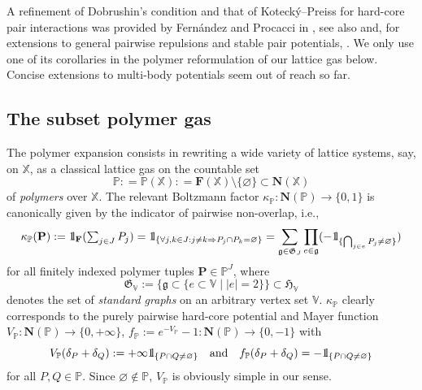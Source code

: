 \documentclass[10pt,a4paper]{amsart}
\renewcommand{\P}{\mathbb{P}}
\newcommand{\X}{\mathbb X}
\newcommand{\V}{\mathbb V}
\def\1{{\mathchoice {1\mskip-4mu\mathrm l}      
{1\mskip-4mu\mathrm l}
{1\mskip-4.5mu\mathrm l} {1\mskip-5mu\mathrm l}}}
\begin{document}
A refinement of Dobrushin's condition and that of Koteck{\'y}--Preiss for hard-core pair interactions was provided by Fern{\'a}ndez and Procacci in \cite{ref:fernandez-procacci}, see also \cite{ref:bissacot-fernandez-procacci} and, for extensions to general pairwise repulsions and stable pair potentials, \cite{ref:faris, ref:jansen-cluster, ref:jansen-kolesnikov}. 
We only use one of its corollaries in the polymer reformulation of our lattice gas below. 
Concise extensions to multi-body potentials seem out of reach so far.

\subsection{The subset polymer gas}

The polymer expansion consists in rewriting a wide variety of lattice systems, say, on $\X$, as a classical lattice gas on the countable set
\[
	\P : = \P(\X) : = \mathbf F(\X) \setminus \{\varnothing\} \subset \mathbf N(\X)
\]
of \emph{polymers} over $\X$. 
The relevant Boltzmann factor $\kappa_\P : \mathbf N(\P) \to \{0, 1\}$ is canonically given by the indicator of pairwise non-overlap, i.e.,
\[
	\kappa_\P (\mathbf P) : = \1_\mathbf F({\textstyle \sum_{j \in J} P_j}) = \1_{\{\forall j, k \in J : j \neq k \Rightarrow P_j \cap P_k = \varnothing\}} = \sum_{\mathfrak g \in \mathfrak G_J} \prod_{e \in \mathfrak g} (-\1_{\{\bigcap_{j\in e} P_j \neq \varnothing\}})
\]
for all finitely indexed polymer tuples $\mathbf P \in \P^J$, where
\[
	\mathfrak G_\V := \{\mathfrak g \subset \{e \subset \V \mid |e| = 2\}\} \subset \mathfrak H_\V
\]
denotes the set of \emph{standard graphs} on an arbitrary vertex set $\V$. 
$\kappa_\P$ clearly corresponds to the purely pairwise hard-core potential and Mayer function $V_\P : \mathbf N(\P) \to \{0,+\infty\}$, $f_\P := e^{-V_\P}-1 : \mathbf N(\P) \to \{0, -1\}$ with
\[
	V_\P(\delta_P + \delta_Q) := +\infty \1_{\{P \cap Q \neq \varnothing\}} \quad \text{and} \quad f_\P(\delta_P + \delta_Q) = -\1_{\{P \cap Q \neq \varnothing\}}
\]
for all $P, Q \in \P$. 
Since $\varnothing \notin \P$, $V_\P$ is obviously simple in our sense.
\end{document}
